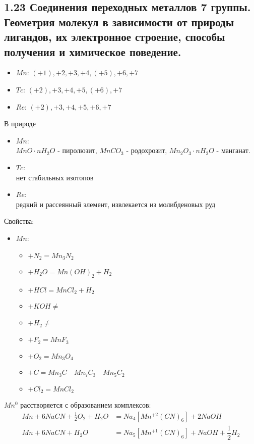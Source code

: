 \subsection{1.23 Соединения переходных металлов 7 группы. Геометрия молекул в зависимости от природы лигандов, их электронное строение, способы получения и химическое поведение.}
\begin{itemize}
	\item $Mn$: $(+1), +2, +3, +4, (+5), +6, +7$	
	\item $Tc$: $(+2), +3, +4, +5, (+6), +7$
	\item $Re$: $(+2), +3, +4, +5, +6, +7$
\end{itemize}
В природе 
\begin{itemize}
	\item $Mn$: \\
	$MnO \cdot nH_2O$ - пиролюзит, $MnCO_3$ - родохрозит, $Mn_2O_3 \cdot nH_2O$ - манганат.
	\item $Tc$: \\
	нет стабильных изотопов
	\item $Re$: \\
	редкий и рассеянный  элемент, извлекается из молибденовых руд
\end{itemize}
Свойства:
\begin{itemize}
	\item $Mn$:
	\begin{itemize}
		\item $+ N_2 = Mn_3N_2 $
		\item $+ H_2O = Mn(OH)_2 + H_2 $
		\item $+ HCl = MnCl_2 + H_2 $
		\item $+ KOH \not =  $
		\item $+ H_2 \not = $
		\item $+ F_2  = MnF_3$
		\item $+ O_2 = Mn_3O_4 $
		\item $+ C = Mn_3C \quad Mn_7C_3 \quad Mn_5C_2 $
		\item $+ Cl_2 =  MnCl_2 $		
	\end{itemize}
\end{itemize}
$Mn^0$ расстворяется с образованием комплексов:
\begin{align*}
Mn + 6 NaCN + \frac12 O_2 + H_2O &= Na_4\left[Mn^{+2}(CN)_6\right] + 2NaOH \\
Mn + 6 NaCN + H_2O &= Na_5\left[Mn^{+1}(CN)_6\right] + NaOH + \dfrac12 H_2
\end{align*}
\begin{figure} [H]
	\centering {\texttt{[image: zz1]}}
\end{figure}
